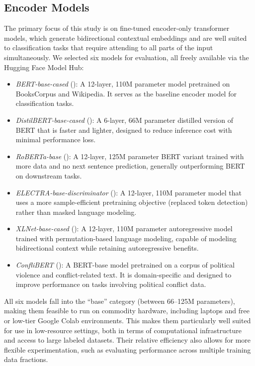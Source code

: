 \documentclass[
  11pt,
]{article}
\providecommand{\tightlist}{%
  \setlength{\itemsep}{0pt}\setlength{\parskip}{0pt}}
\begin{document}
\subsection{Encoder Models}\label{encoder-models}

The primary focus of this study is on fine-tuned encoder-only
transformer models, which generate bidirectional contextual embeddings
and are well suited to classification tasks that require attending to
all parts of the input simultaneously. We selected six models for
evaluation, all freely available via the Hugging Face Model Hub:

\begin{itemize}
\tightlist
\item
  \emph{BERT-base-cased} (): A 12-layer, 110M parameter model pretrained on BooksCorpus and
  Wikipedia. It serves as the baseline encoder model for classification
  tasks.
\item
  \emph{DistilBERT-base-cased} (): A 6-layer, 66M parameter distilled version of BERT that is
  faster and lighter, designed to reduce inference cost with minimal
  performance loss.
\item
  \emph{RoBERTa-base} (): A
  12-layer, 125M parameter BERT variant trained with more data and no
  next sentence prediction, generally outperforming BERT on downstream
  tasks.
\item
  \emph{ELECTRA-base-discriminator} (): A 12-layer, 110M parameter model that uses a more
  sample-efficient pretraining objective (replaced token detection)
  rather than masked language modeling.
\item
  \emph{XLNet-base-cased} (): A
  12-layer, 110M parameter autoregressive model trained with
  permutation-based language modeling, capable of modeling bidirectional
  context while retaining autoregressive benefits.
\item
  \emph{ConfliBERT} (): A BERT-base
  model pretrained on a corpus of political violence and
  conflict-related text. It is domain-specific and designed to improve
  performance on tasks involving political conflict data.
\end{itemize}

\noindent All six models fall into the ``base'' category (between
66--125M parameters), making them feasible to run on commodity hardware,
including laptops and free or low-tier Google Colab environments. This
makes them particularly well suited for use in low-resource settings,
both in terms of computational infrastructure and access to large
labeled datasets. Their relative efficiency also allows for more
flexible experimentation, such as evaluating performance across multiple
training data fractions.
\end{document}

